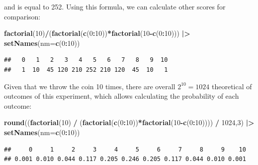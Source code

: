 \documentclass[
]{book}
\newenvironment{Shaded}{\begin{snugshade}}{\end{snugshade}}
\newcommand{\DataTypeTok}[1]{\textcolor[rgb]{0.13,0.29,0.53}{#1}}
\newcommand{\DecValTok}[1]{\textcolor[rgb]{0.00,0.00,0.81}{#1}}
\newcommand{\ErrorTok}[1]{\textcolor[rgb]{0.64,0.00,0.00}{\textbf{#1}}}
\newcommand{\KeywordTok}[1]{\textcolor[rgb]{0.13,0.29,0.53}{\textbf{#1}}}
\newcommand{\NormalTok}[1]{#1}
\newcommand{\OperatorTok}[1]{\textcolor[rgb]{0.81,0.36,0.00}{\textbf{#1}}}
\newcommand{\StringTok}[1]{\textcolor[rgb]{0.31,0.60,0.02}{#1}}
\theoremstyle{definition}
\theoremstyle{definition}
\theoremstyle{definition}
\theoremstyle{definition}
\theoremstyle{remark}
\begin{document}
and is equal to 252. Using this formula, we can calculate other scores for comparison:

\begin{Shaded}
\begin{Highlighting}[]
\KeywordTok{factorial}\NormalTok{(}\DecValTok{10}\NormalTok{)}\OperatorTok{/}\NormalTok{(}\KeywordTok{factorial}\NormalTok{(}\KeywordTok{c}\NormalTok{(}\DecValTok{0}\OperatorTok{:}\DecValTok{10}\NormalTok{))}\OperatorTok{*}\KeywordTok{factorial}\NormalTok{(}\DecValTok{10}\OperatorTok{{-}}\KeywordTok{c}\NormalTok{(}\DecValTok{0}\OperatorTok{:}\DecValTok{10}\NormalTok{))) }\OperatorTok{|}\ErrorTok{\textgreater{}}
\StringTok{    }\KeywordTok{setNames}\NormalTok{(}\DataTypeTok{nm=}\KeywordTok{c}\NormalTok{(}\DecValTok{0}\OperatorTok{:}\DecValTok{10}\NormalTok{))}
\end{Highlighting}
\end{Shaded}

\begin{verbatim}
##   0   1   2   3   4   5   6   7   8   9  10 
##   1  10  45 120 210 252 210 120  45  10   1
\end{verbatim}

Given that we throw the coin 10 times, there are overall \(2^{10}=1024\) theoretical of outcomes of this experiment, which allows calculating the probability of each outcome:

\begin{Shaded}
\begin{Highlighting}[]
\KeywordTok{round}\NormalTok{((}\KeywordTok{factorial}\NormalTok{(}\DecValTok{10}\NormalTok{) }\OperatorTok{/}
\StringTok{           }\NormalTok{(}\KeywordTok{factorial}\NormalTok{(}\KeywordTok{c}\NormalTok{(}\DecValTok{0}\OperatorTok{:}\DecValTok{10}\NormalTok{))}\OperatorTok{*}\KeywordTok{factorial}\NormalTok{(}\DecValTok{10}\OperatorTok{{-}}\KeywordTok{c}\NormalTok{(}\DecValTok{0}\OperatorTok{:}\DecValTok{10}\NormalTok{)))) }\OperatorTok{/}
\StringTok{          }\DecValTok{1024}\NormalTok{,}\DecValTok{3}\NormalTok{) }\OperatorTok{|}\ErrorTok{\textgreater{}}
\StringTok{    }\KeywordTok{setNames}\NormalTok{(}\DataTypeTok{nm=}\KeywordTok{c}\NormalTok{(}\DecValTok{0}\OperatorTok{:}\DecValTok{10}\NormalTok{))}
\end{Highlighting}
\end{Shaded}

\begin{verbatim}
##     0     1     2     3     4     5     6     7     8     9    10 
## 0.001 0.010 0.044 0.117 0.205 0.246 0.205 0.117 0.044 0.010 0.001
\end{verbatim}
\end{document}
